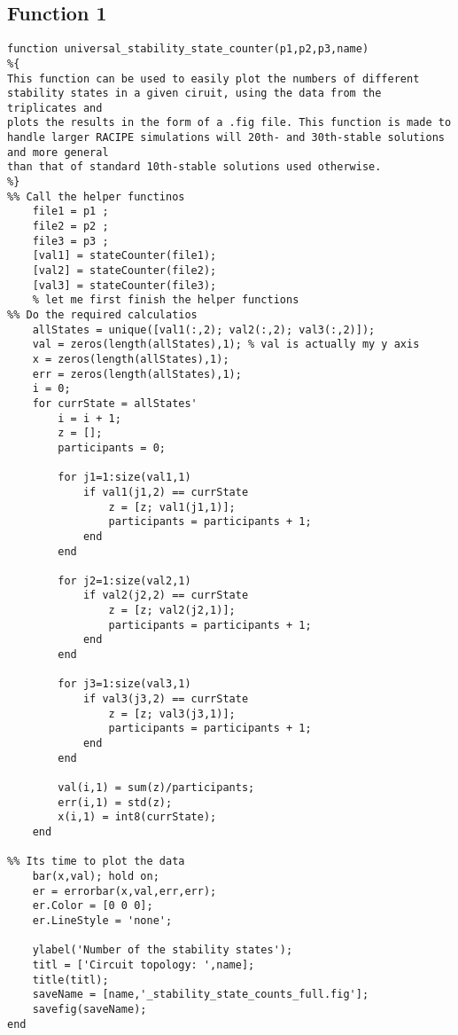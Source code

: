 \documentclass{article}
\begin{document}
\subsection*{Function 1}
\begin{verbatim}
function universal_stability_state_counter(p1,p2,p3,name)
%{
This function can be used to easily plot the numbers of different
stability states in a given ciruit, using the data from the triplicates and
plots the results in the form of a .fig file. This function is made to 
handle larger RACIPE simulations will 20th- and 30th-stable solutions and more general
than that of standard 10th-stable solutions used otherwise.
%}
%% Call the helper functinos 
    file1 = p1 ;
    file2 = p2 ;
    file3 = p3 ;
    [val1] = stateCounter(file1);
    [val2] = stateCounter(file2);
    [val3] = stateCounter(file3);
    % let me first finish the helper functions
%% Do the required calculatios     
    allStates = unique([val1(:,2); val2(:,2); val3(:,2)]);
    val = zeros(length(allStates),1); % val is actually my y axis 
    x = zeros(length(allStates),1);
    err = zeros(length(allStates),1);
    i = 0;
    for currState = allStates'
        i = i + 1; 
        z = [];
        participants = 0;
        
        for j1=1:size(val1,1)
            if val1(j1,2) == currState
                z = [z; val1(j1,1)];
                participants = participants + 1;
            end
        end
        
        for j2=1:size(val2,1)
            if val2(j2,2) == currState
                z = [z; val2(j2,1)];
                participants = participants + 1;
            end
        end
        
        for j3=1:size(val3,1)
            if val3(j3,2) == currState
                z = [z; val3(j3,1)];
                participants = participants + 1;
            end
        end
        
        val(i,1) = sum(z)/participants;
        err(i,1) = std(z);
        x(i,1) = int8(currState);
    end
    
%% Its time to plot the data 
    bar(x,val); hold on;
    er = errorbar(x,val,err,err);    
    er.Color = [0 0 0];                            
    er.LineStyle = 'none';  
    
    ylabel('Number of the stability states');
    titl = ['Circuit topology: ',name];
    title(titl);
    saveName = [name,'_stability_state_counts_full.fig'];
    savefig(saveName);
end
\end{verbatim}
\end{document}
